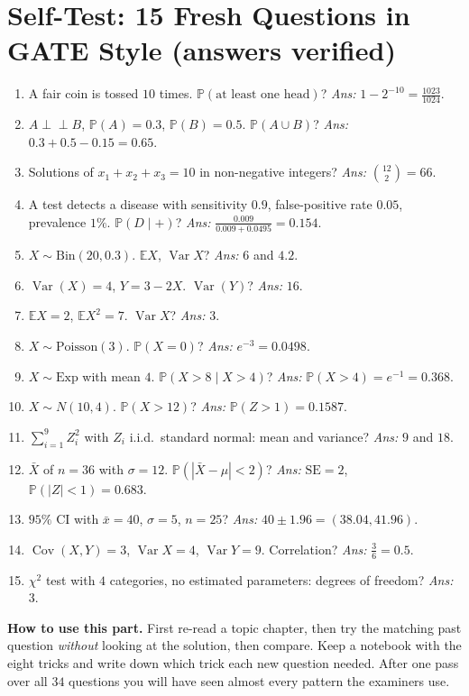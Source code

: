 \documentclass[11pt,a4paper]{article}
\newcommand{\E}{\mathbb{E}}
\newcommand{\Var}{\operatorname{Var}}
\newcommand{\Cov}{\operatorname{Cov}}
\renewcommand{\Pr}{\mathbb{P}}
\newcommand{\ind}{\perp\!\!\!\perp}
\begin{document}
\section{Self-Test: 15 Fresh Questions in GATE Style (answers verified)}
\begin{enumerate}[leftmargin=*,itemsep=3pt]
\item A fair coin is tossed $10$ times. $\Pr(\text{at least one head})$? \emph{Ans:} $1-2^{-10}=\frac{1023}{1024}$.
\item $A\ind B$, $\Pr(A)=0.3$, $\Pr(B)=0.5$. $\Pr(A\cup B)$? \emph{Ans:} $0.3+0.5-0.15=0.65$.
\item Solutions of $x_1+x_2+x_3=10$ in non-negative integers? \emph{Ans:} $\binom{12}{2}=66$.
\item A test detects a disease with sensitivity $0.9$, false-positive rate $0.05$, prevalence $1\%$. $\Pr(D\mid+)$? \emph{Ans:} $\frac{0.009}{0.009+0.0495}=0.154$.
\item $X\sim\text{Bin}(20,0.3)$. $\E X$, $\Var X$? \emph{Ans:} $6$ and $4.2$.
\item $\Var(X)=4$, $Y=3-2X$. $\Var(Y)$? \emph{Ans:} $16$.
\item $\E X=2$, $\E X^2=7$. $\Var X$? \emph{Ans:} $3$.
\item $X\sim\text{Poisson}(3)$. $\Pr(X=0)$? \emph{Ans:} $e^{-3}=0.0498$.
\item $X\sim\text{Exp}$ with mean $4$. $\Pr(X>8\mid X>4)$? \emph{Ans:} $\Pr(X>4)=e^{-1}=0.368$.
\item $X\sim N(10,4)$. $\Pr(X>12)$? \emph{Ans:} $\Pr(Z>1)=0.1587$.
\item $\sum_{i=1}^{9}Z_i^2$ with $Z_i$ i.i.d.\ standard normal: mean and variance? \emph{Ans:} $9$ and $18$.
\item $\bar X$ of $n=36$ with $\sigma=12$. $\Pr(|\bar X-\mu|<2)$? \emph{Ans:} $\mathrm{SE}=2$, $\Pr(|Z|<1)=0.683$.
\item $95\%$ CI with $\bar x=40$, $\sigma=5$, $n=25$? \emph{Ans:} $40\pm1.96=(38.04,41.96)$.
\item $\Cov(X,Y)=3$, $\Var X=4$, $\Var Y=9$. Correlation? \emph{Ans:} $\frac{3}{6}=0.5$.
\item $\chi^2$ test with $4$ categories, no estimated parameters: degrees of freedom? \emph{Ans:} $3$.
\end{enumerate}

\vspace{3mm}
\begin{intuition}
\textbf{How to use this part.}
First re-read a topic chapter, then try the matching past question \emph{without} looking at the solution, then compare. Keep a notebook with the eight tricks and write down which trick each new question needed. After one pass over all $34$ questions you will have seen almost every pattern the examiners use.
\end{intuition}
\end{document}
